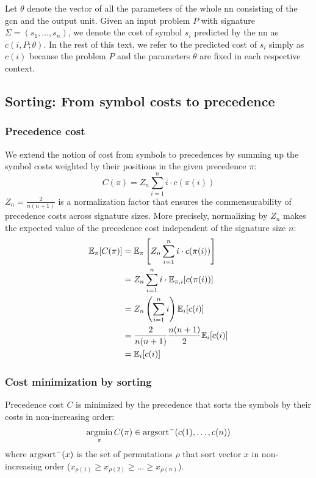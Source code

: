 Let $\theta$ denote the vector of all the parameters of the whole \acrlong{nn} consisting of the \gls{gcn} and the output unit.
Given an input problem $P$ with signature $\Sigma = (s_1, \ldots, s_n)$,
we denote the cost of symbol $s_i$ predicted by the \acrlong{nn} as $c(i, P; \theta)$.
In the rest of this text,
we refer to the predicted cost of $s_i$ simply as $c(i)$
because the problem $P$ and the parameters $\theta$ are fixed in each respective context.

\subsection{Sorting: From symbol costs to precedence}
\label{sec:ranking}

\subsubsection{Precedence cost}
We extend the notion of cost from symbols to precedences
by summing up the symbol costs
weighted by their positions in the given precedence $\pi$:
$$
C(\pi) = Z_n \sum_{i=1}^n i \cdot c(\pi(i))%
$$
$Z_n = \frac{2}{n(n+1)}$ is a normalization factor
that ensures the commensurability of precedence costs across signature sizes.
More precisely, normalizing by $Z_n$ makes the expected value of the precedence cost
independent of the signature size $n$:
\begin{align*}
\mathbb{E}_\pi [C(\pi)]
&= \mathbb{E}_\pi \left[Z_n \sum_{i=1}^n i \cdot c(\pi(i))\right] \\
&= Z_n \sum_{i=1}^n i \cdot \mathbb{E}_{\pi, i} [c(\pi(i))] \\
&= Z_n \left(\sum_{i=1}^n i\right) \mathbb{E}_i [c(i)] \\
&= \frac{2}{n(n+1)} \frac{n(n+1)}{2} \mathbb{E}_i [c(i)] \\
&= \mathbb{E}_i [c(i)]
\end{align*}


\subsubsection{Cost minimization by sorting}
\begin{lemma}
Precedence cost $C$ is minimized by the precedence that sorts the symbols by their costs in non-increasing order:
$$
\operatorname*{argmin}_\pi C(\pi) \in \operatorname{argsort}^- (c(1), \ldots, c(n))
$$
where $\operatorname{argsort}^-(x)$ is the set of permutations $\rho$ that sort vector $x$ in non-increasing order ($x_{\rho(1)} \geq x_{\rho(2)} \geq \ldots \geq x_{\rho(n)}$).
\end{lemma}

